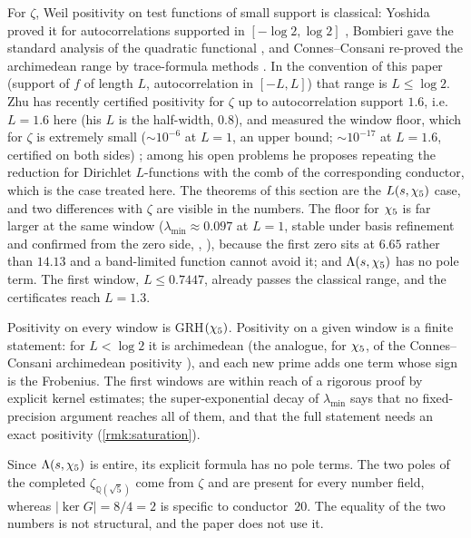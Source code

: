 \begin{remark}\label{rmk:yoshida}
For $\zeta$, Weil positivity on test functions of small support is classical:
Yoshida proved it for autocorrelations supported in $[-\log2,\log2]$
\cite{yoshida92}, Bombieri gave the standard analysis of the quadratic functional
\cite{bombieri00}, and Connes--Consani re-proved the archimedean range by trace-formula
methods \cite{connesconsani21}.  In the convention of this paper (support of $f$ of
length $L$, autocorrelation in $[-L,L]$) that range is $L\le\log2$.  Zhu has recently certified positivity for $\zeta$ up to autocorrelation support $1.6$, i.e.\ $L=1.6$ here (his $L$ is the half-width, $0.8$), and measured the window floor, which for $\zeta$ is extremely small ($\sim10^{-6}$ at $L=1$, an upper bound; $\sim10^{-17}$ at $L=1.6$, certified on both sides) \cite{zhu26}; among his open problems he proposes repeating the reduction for Dirichlet $L$-functions with the comb of the corresponding conductor, which is the case treated here.  The theorems of this section are the
$L(s,\chi_5)$ case, and two differences with $\zeta$ are visible in the numbers.  The
floor for $\chi_5$ is far larger at the same window ($\lambda_{\min}\approx0.097$ at
$L=1$, stable under basis refinement and confirmed from the zero side,
, ), because the
first zero sits at $6.65$ rather than $14.13$ and a band-limited function cannot
avoid it; and $\Lambda(s,\chi_5)$ has no pole term.  The first window,
$L\le0.7447$, already passes the classical range, and the certificates reach
$L=1.3$.
\end{remark}

\begin{remark}
Positivity on every window is GRH$(\chi_5)$.  Positivity on a given window is a
finite statement: for $L<\log2$ it is archimedean (the analogue, for
$\chi_5$, of the Connes--Consani archimedean positivity
\cite{connesconsani21}), and each new prime adds one term whose sign is
the Frobenius.  The first windows are within reach of a rigorous proof by
explicit kernel estimates; the super-exponential decay of $\lambda_{\min}$ says
that no fixed-precision argument reaches all of them, and that the full
statement needs an exact positivity (\cref{rmk:saturation}).
\end{remark}

\begin{remark}
Since $\Lambda(s,\chi_5)$ is entire, its explicit formula has no pole terms.
The two poles of the completed $\zeta_{\mathbb{Q}(\sqrt5)}$ come from $\zeta$ and
are present for every number field, whereas $|\ker G|=8/4=2$ is specific to
conductor~$20$.  The equality of the two numbers is not structural, and the
paper does not use it.
\end{remark}

